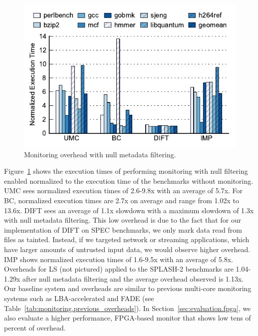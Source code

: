 \begin{figure}
  \begin{center}
    \includegraphics[width=\columnwidth]{figs/data_filtering.pdf}
    \vspace{-0.2in}
    \caption{Monitoring overhead with null metadata filtering.}
    \label{fig:evaluation.filtering}
    \vspace{-0.3in}
  \end{center}
\end{figure}

Figure~\ref{fig:evaluation.filtering} shows the
execution times of performing monitoring with null filtering enabled normalized
to the execution time of the benchmarks without monitoring. UMC sees normalized
execution times of 2.6-9.8x with an average of 5.7x.
For BC, normalized execution times
are 2.7x on average and range from 1.02x to 13.6x.
DIFT sees an average of 1.1x slowdown with a maximum slowdown of 1.3x with null
metadata filtering. This low overhead is due to the fact
that for our implementation of DIFT on SPEC
benchmarks, we only mark data read from files as tainted. Instead, if we
targeted network or streaming applications, which have larger amounts of
untrusted input data, we would observe higher overhead. IMP shows normalized
execution times of 1.6-9.5x with an average of 5.8x. Overheads for LS (not pictured)
applied to the SPLASH-2 benchmarks are
1.04-1.29x after null metadata filtering and the average
overhead observed is 1.13x.
Our baseline system and overheads are similar to previous multi-core
monitoring systems such as LBA-accelerated \cite{lba-isca08} and FADE
\cite{fade-hpca14} (see
Table~\ref{tab:monitoring.previous_overheads}). In
Section~\ref{sec:evaluation.fpga}, we also evaluate a higher performance, FPGA-based
monitor that shows low tens of percent of overhead. 

